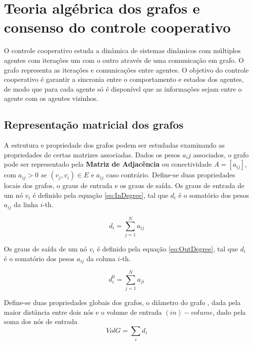 \section{Teoria algébrica dos grafos e consenso do controle cooperativo}

O controle cooperativo estuda a dinâmica de sistemas dinâmicos com múltiplos agentes com iterações um com o outro através de uma comunicação em grafo. 
O grafo representa as iterações e comunicações entre agentes. O objetivo do controle cooperativo é garantir a sincronia entre o comportamento e estados dos agentes, de modo que para cada agente só é disponível que as informações sejam entre o agente com os agentes vizinhos.

\subsection{Representação matricial dos grafos}
A estrutura e propriedade dos grafos podem ser estudadas examinando as propriedades de certas matrizes associadas. Dados os pesos $a{_ij}$ associados, o grafo pode ser representado pela \textbf{Matriz de Adjacência} ou conectividade $A = [a_{ij}]$, com $a_{ij}>0$ $se$ $(v_{j},v_{i}) \in E $ e $a_{ij}$ caso contrário.   
Define-se duas propriedades locais dos grafos, o graus de entrada e os graus de saída.
Os graus de entrada de um nó $v_{i}$ é definido pela equação \ref{eq:InDegree}, tal que $d_{i}$ é o somatório dos pesos $a_{ij}$ da linha $i$-th.

\begin{equation} \label{eq:InDegree}
    d_{i} = \displaystyle\sum_{j=1}^{N}a_{ij}
\end{equation}

Os graus de saída de um nó $v_{i}$ é definido pela equação \ref{eq:OutDegree}, tal que $d_{i}$ é o somatório dos pesos $a_{ij}$ da coluna $i$-th.

\begin{equation}\label{eq:OutDegree}
    d_{i}^0 = \displaystyle\sum_{j = 1}^{N}a_{ji}
\end{equation}

Define-se duas propriedades globais dos grafos, o diâmetro do grafo , dada pela maior distância entre dois nós e o volume de entrada $(in)-volume$, dado pela soma dos nós de entrada
\begin{equation}
    VolG=\displaystyle\sum_{i}d_{i}
\end{equation}

